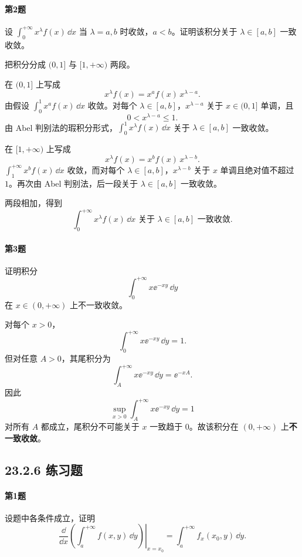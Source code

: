 \paragraph{第2题}
设 $\int_0^{+\infty}x^\lambda f(x)\,\dd x$ 当 $\lambda=a,b$ 时收敛，$a<b$。证明该积分关于 $\lambda\in[a,b]$ 一致收敛。

\begin{xsolution}
把积分分成 $(0,1]$ 与 $[1,+\infty)$ 两段。

在 $(0,1]$ 上写成
\[
x^\lambda f(x)=x^a f(x)\,x^{\lambda-a}.
\]
由假设 $\int_0^1x^a f(x)\,\dd x$ 收敛。对每个 $\lambda\in[a,b]$，$x^{\lambda-a}$ 关于 $x\in(0,1]$ 单调，且
\[
0<x^{\lambda-a}\leqslant1.
\]
由 Abel 判别法的瑕积分形式，$\int_0^1x^\lambda f(x)\,\dd x$ 关于 $\lambda\in[a,b]$ 一致收敛。

在 $[1,+\infty)$ 上写成
\[
x^\lambda f(x)=x^b f(x)\,x^{\lambda-b}.
\]
$\int_1^{+\infty}x^b f(x)\,\dd x$ 收敛，而对每个 $\lambda\in[a,b]$，$x^{\lambda-b}$ 关于 $x$ 单调且绝对值不超过 $1$。再次由 Abel 判别法，后一段关于 $\lambda\in[a,b]$ 一致收敛。

两段相加，得到
\[
\boxed{\int_0^{+\infty}x^\lambda f(x)\,\dd x
\text{ 关于 }\lambda\in[a,b]\text{ 一致收敛}}.
\]
\end{xsolution}

\paragraph{第3题}
证明积分
\[
\int_0^{+\infty}x\ee^{-xy}\,\dd y
\]
在 $x\in(0,+\infty)$ 上不一致收敛。

\begin{xsolution}
对每个 $x>0$，
\[
\int_0^{+\infty}x\ee^{-xy}\,\dd y=1.
\]
但对任意 $A>0$，其尾积分为
\[
\int_A^{+\infty}x\ee^{-xy}\,\dd y=\ee^{-xA}.
\]
因此
\[
\sup_{x>0}\int_A^{+\infty}x\ee^{-xy}\,\dd y=1
\]
对所有 $A$ 都成立，尾积分不可能关于 $x$ 一致趋于 $0$。故该积分在 $(0,+\infty)$ 上\textbf{不一致收敛}。
\end{xsolution}

\subsection*{23.2.6 练习题}

\paragraph{第1题}
设题中各条件成立，证明
\[
\left.\frac{\dd}{\dd x}\left(\int_a^{+\infty}f(x,y)\,\dd y\right)\right|_{x=x_0}
=\int_a^{+\infty}f_x(x_0,y)\,\dd y.
\]

